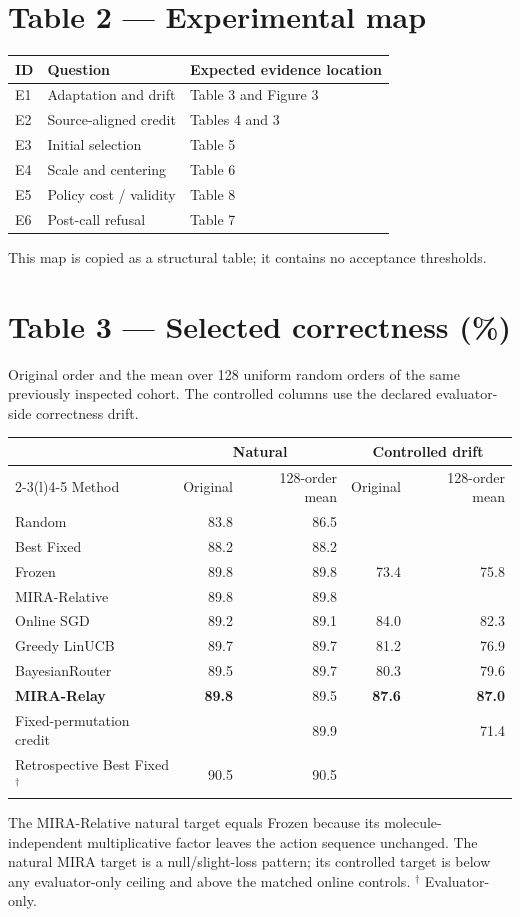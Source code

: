 \documentclass[10pt]{article}
\newcommand{\notrun}{\textemdash}
\newcommand{\smallnote}[1]{{\footnotesize\color{Gray}#1}}
\begin{document}
\section*{Table 2 --- Experimental map}
\begin{tabularx}{\linewidth}{@{}llX@{}}
\toprule
ID & Question & Expected evidence location \\
\midrule
E1 & Adaptation and drift & Table 3 and Figure 3 \\
E2 & Source-aligned credit & Tables 4 and 3 \\
E3 & Initial selection & Table 5 \\
E4 & Scale and centering & Table 6 \\
E5 & Policy cost / validity & Table 8 \\
E6 & Post-call refusal & Table 7 \\
\bottomrule
\end{tabularx}
\smallnote{This map is copied as a structural table; it contains no acceptance thresholds.}

\clearpage
\section*{Table 3 --- Selected correctness (\%)}
\smallnote{Original order and the mean over 128 uniform random orders of the same previously inspected cohort. The controlled columns use the declared evaluator-side correctness drift.}
\begin{tabularx}{\linewidth}{@{}Xrrrr@{}}
\toprule
& \multicolumn{2}{c}{Natural} & \multicolumn{2}{c}{Controlled drift} \\
\cmidrule(lr){2-3}\cmidrule(l){4-5}
Method & Original & 128-order mean & Original & 128-order mean \\
\midrule
Random & 83.8 & 86.5 & \notrun & \notrun \\
Best Fixed & 88.2 & 88.2 & \notrun & \notrun \\
Frozen & 89.8 & 89.8 & 73.4 & 75.8 \\
MIRA-Relative & 89.8 & 89.8 & \notrun & \notrun \\
\midrule
Online SGD & 89.2 & 89.1 & 84.0 & 82.3 \\
Greedy LinUCB & 89.7 & 89.7 & 81.2 & 76.9 \\
BayesianRouter & 89.5 & 89.7 & 80.3 & 79.6 \\
\textbf{MIRA-Relay} & \textbf{89.8} & 89.5 & \textbf{87.6} & \textbf{87.0} \\
\midrule
Fixed-permutation credit & \notrun & 89.9 & \notrun & 71.4 \\
\midrule
Retrospective Best Fixed$^{\dagger}$ & 90.5 & 90.5 & \notrun & \notrun \\
\bottomrule
\end{tabularx}
\smallnote{The MIRA-Relative natural target equals Frozen because its molecule-independent multiplicative factor leaves the action sequence unchanged. The natural MIRA target is a null/slight-loss pattern; its controlled target is below any evaluator-only ceiling and above the matched online controls. $^{\dagger}$ Evaluator-only.}
\end{document}
